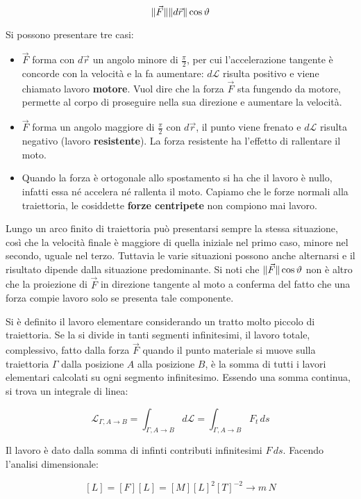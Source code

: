 \[
	\lVert\vec{F}\rVert\lVert d\vec{r}\rVert\cos\vartheta
\]

Si possono presentare tre casi:

\begin{itemize}
	\item $\vec{F}$ forma con $d\vec{r}$ un angolo minore di $\frac{\pi}{2}$, per cui l'accelerazione tangente è concorde con la velocità e la fa aumentare: $d\mathcal{L}$ risulta positivo e viene chiamato lavoro \textbf{motore}. Vuol dire che la forza $\vec{F}$ sta fungendo da motore, permette al corpo di proseguire nella sua direzione e aumentare la velocità.
	\item $\vec{F}$ forma un angolo maggiore di $\frac{\pi}{2}$ con $d\vec{r}$, il punto viene frenato e $d\mathcal{L}$ risulta negativo (lavoro \textbf{resistente}). La forza resistente ha l'effetto di rallentare il moto.
	\item Quando la forza è ortogonale allo spostamento si ha che il lavoro è nullo, infatti essa né accelera né rallenta il moto. Capiamo che le forze normali alla traiettoria, le cosiddette \textbf{forze centripete} non compiono mai lavoro.
\end{itemize}

Lungo un arco finito di traiettoria può presentarsi sempre la stessa situazione, così che la velocità finale è maggiore di quella iniziale nel primo caso, minore nel secondo, uguale nel terzo. Tuttavia le varie situazioni possono anche alternarsi e il risultato dipende dalla situazione predominante.
Si noti che $\lVert\vec{F}\rVert \cos\vartheta$ non è altro che la proiezione di $\vec{F}$ in direzione tangente al moto a conferma del fatto che una forza compie lavoro solo se presenta tale componente.

Si è definito il lavoro elementare considerando un tratto molto piccolo di traiettoria. Se la si divide in tanti segmenti infinitesimi, il lavoro totale, complessivo, fatto dalla forza $\vec{F}$ quando il punto materiale si muove sulla traiettoria $\Gamma$ dalla posizione $A$ alla posizione $B$, è la somma di tutti i lavori elementari calcolati su ogni segmento infinitesimo. Essendo una somma continua, si trova un integrale di linea:

\[
	\boxed{\mathcal{L}_{\Gamma, A\to B}=\int_{\Gamma, A\to B} d\mathcal{L}=\int_{\Gamma, A\to B} F_t\,ds}
\]

Il lavoro è dato dalla somma di infinti contributi infinitesimi $F\,ds$.
Facendo l'analisi dimensionale:

\[
	[L]=[F][L]=[M][L]^2[T]^{-2} \to m\,N
\]

